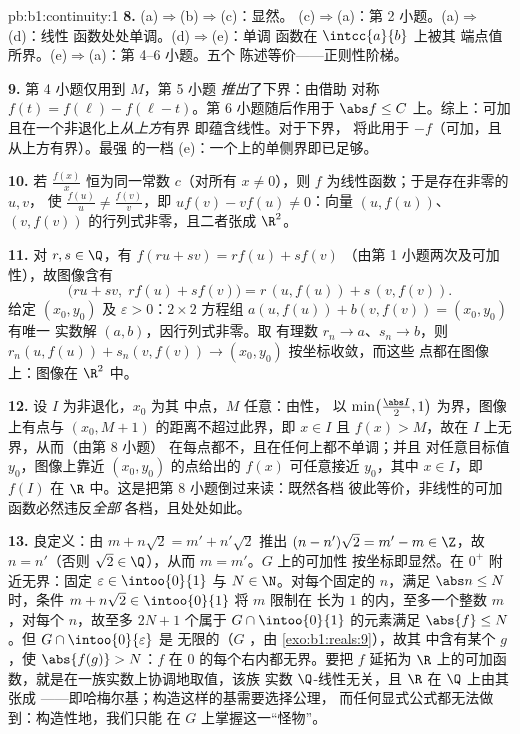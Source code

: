 \begin{solution}{pb:b1:continuity:1}
\textbf{8.} (a)$\Rightarrow$(b)$\Rightarrow$(c)：显然。
(c)$\Rightarrow$(a)：第 2 小题。(a)$\Rightarrow$(d)：线性
函数处处单调。(d)$\Rightarrow$(e)：单调
函数在 $\intcc{a}{b}$ 上被其
端点值所界。(e)$\Rightarrow$(a)：第 4--6 小题。五个
陈述等价——正则性阶梯。

\textbf{9.} 第 4 小题仅用到 $M$，第 5 小题
\emph{推出}了下界：由借助
对称 $f(t) = f(\ell) - f(\ell - t)$。第 6 小题随后作用于
$\abs f \leq C$ 上。综上：可加且在一个非退化上\emph{从上方}有界
即蕴含线性。对于下界，
将此用于 $-f$（可加，且从上方有界）。最强
的一档 (e)：一个上的单侧界即已足够。

\textbf{10.} 若 $\frac{f(x)}{x}$ 恒为同一常数 $c$（对所有
$x \neq 0$），则 $f$ 为线性函数；于是存在非零的 $u, v$，
使 $\frac{f(u)}u \neq \frac{f(v)}v$，即 $u f(v) - v f(u)
\neq 0$：向量 $(u, f(u))$、$(v,
f(v))$ 的行列式非零，且二者张成 $\R^2$。

\textbf{11.} 对 $r, s \in \Q$，有 $f(ru + sv) = r f(u) + s f(v)$
（由第 1 小题两次及可加性），故图像含有
\[
\bigl(ru + sv,\; r f(u) + s f(v)\bigr)
= r\,(u, f(u)) + s\,(v, f(v)) .
\]
给定 $(x_0, y_0)$ 及 $\varepsilon > 0$：$2 \times 2$
方程组 $a(u, f(u)) + b(v, f(v)) = (x_0, y_0)$ 有唯一
实数解 $(a, b)$，因行列式非零。取
有理数 $r_n \to a$、$s_n \to b$，则 $r_n(u, f(u)) +
s_n(v, f(v)) \to (x_0, y_0)$ 按坐标收敛，而这些
点都在图像上：图像在 $\R^2$ 中。

\textbf{12.} 设 $I$ 为非退化，$x_0$ 为其
中点，$M$ 任意：由性，
以 $\min\bigl(\frac{\abs I}{2}, 1\bigr)$ 为界，图像上有点与 $(x_0, M + 1)$ 的距离不超过此界，即
$x \in I$ 且 $f(x) > M$，故在 $I$ 上无界，从而（由第 8 小题）
在每点都不，且在任何上都不单调；并且
对任意目标值 $y_0$，图像上靠近 $(x_0, y_0)$ 的点给出的 $f(x)$
可任意接近 $y_0$，其中 $x \in I$，即 $f(I)$ 在
$\R$ 中。这是把第 8 小题倒过来读：既然各档
彼此等价，非线性的可加函数必然违反\emph{全部}
各档，且处处如此。

\textbf{13.} 良定义：由 $m + n\sqrt2 = m' + n'\sqrt2$ 推出
$(n - n')\sqrt2 = m' - m \in \Z$，故 $n = n'$（否则 $\sqrt2 \in
\Q$），从而 $m = m'$。$G$ 上的可加性
按坐标即显然。在 $0^+$ 附近无界：固定 $\varepsilon \in
\intoo{0}{1}$ 与 $N \in \N$。对每个固定的 $n$，满足 $\abs n
\leq N$ 时，条件 $m + n\sqrt2 \in \intoo{0}{1}$ 将 $m$ 限制在
长为 $1$ 的内，至多一个整数 $m$，对每个
$n$，故至多 $2N + 1$ 个属于 $G \cap \intoo{0}{1}$ 的元素满足
$\abs{f} \leq N$。但 $G \cap \intoo{0}{\varepsilon}$ 是
无限的（$G$ ，由 \cref{exo:b1:reals:9}），故其
中含有某个 $g$，使 $\abs{f(g)} > N$：$f$ 在
$0$ 的每个右内都无界。要把 $f$ 延拓为
$\R$ 上的可加函数，就是在一族实数上协调地取值，该族
实数 $\Q$-线性无关，且 $\R$ 在 $\Q$ 上由其张成
——即哈梅尔基；构造这样的基需要选择公理，
而任何显式公式都无法做到：构造性地，我们只能
在 $G$ 上掌握这一“怪物”。


\end{solution}
